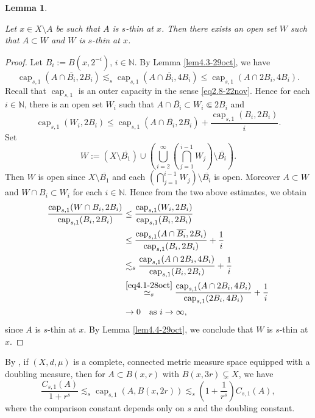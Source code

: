 \documentclass[11pt,leqno]{amsart}
\newtheorem{lemma}[theorem]{Lemma}
\numberwithin{equation}{section}
\theoremstyle{definition}
\DeclareMathOperator{\capp}{cap}
\newcommand{\caps}{\capp_{s,1}}
\begin{document}
	
	\begin{lemma}\label{openset}
		
		Let  $x\in X\setminus A$ be such that  $A$ is $s$-thin at $x$. Then there exists an open set $W$ such that $A\subset W$ and  $W$ is $s$-thin at $x$.
		
		
	\end{lemma}
	\begin{proof}
		Let $B_i:=B(x, 2^{-i})$, $i\in\mathbb N$.
		By Lemma \ref{lem4.3-29oct}, we have
		\[
		\caps(A\cap \overline{B_i}, 2B_i)\lesssim_s  \caps(A\cap\overline{B_i}, 4B_i)\leq  \caps(A\cap {2B_i}, 4B_i).
		\]
		Recall that $\caps$ is an outer capacity in the sense \eqref{eq2.8-22nov}. Hence for each $i\in\mathbb N$, there is an open set $W_i$ such that $A\cap \overline{B_i}\subset W_i\Subset 2B_i$ and 
		\[
		{\caps(W_i, 2B_i)}\leq { \caps(A\cap \overline{B_i}, 2B_i)}+ \frac{{\caps(B_i, 2B_i)}}{i}.
		\]
		Set
		\[
		W:= (X\setminus \overline{B_1}) \cup\left( \bigcup_{i=2}^\infty \left(\bigcap_{j=1}^{i-1}W_j\right)\setminus \overline{B_{i}}\right).
		\]
		Then $W$ is open since $X\setminus \overline{B_1}$ and each $(\bigcap_{j=1}^{i-1}W_j)\setminus \overline{B_{i}}$ is open. Moreover $A\subset W$ and $W\cap B_i\subset W_i$ for each $i\in\mathbb N$. Hence from the two above estimates, we obtain
		\begin{align*}
			\frac{\caps(W\cap B_i, 2B_i)}{\caps(B_i, 2B_i)}
			&\leq \frac{\caps(W_i, 2B_i)}{\caps(B_i, 2B_i)}\\
			&\leq \frac{ \caps(A\cap \overline{B_i}, 2B_i)}{\caps(B_i, 2B_i)} + \frac{1}{i}\\
			&\lesssim_s \frac{ \caps(A\cap 2B_i, 4B_i)}{\caps(B_i, 2B_i)} + \frac{1}{i}\\ 
			&\overset{\eqref{eq4.1-28oct}}{\simeq_s}\frac{ \caps(A\cap 2B_i, 4B_i)}{\caps(2B_i, 4B_i)} + \frac{1}{i} \\
			&\to 0 \quad \text{as $i\to\infty$},
		\end{align*}
		since $A$ is $s$-thin at $x$. By Lemma \ref{lem4.4-29oct}, we conclude that $W$ is $s$-thin at $x$. 
		
		
	\end{proof}
	
	By \cite[Lemma 4.9]{BB23}, if $(X,d,\mu)$ is a complete, connected metric measure space equipped
	with a doubling measure, then for
	$A\subset B(x,r)$ with
	$B(x,3r)\subsetneq X$, we have
	\begin{equation}\label{eq4.7-29oct}
		\frac{C_{s,1}(A)}{1+r^{s}}\lesssim_s \caps(A, B(x, 2r))\lesssim_s \left( 1+\frac{1}{r^{s}}\right)C_{s,1}(A),
	\end{equation}
	where the comparison constant depends only on $s$ and the doubling constant.
	
\end{document}

